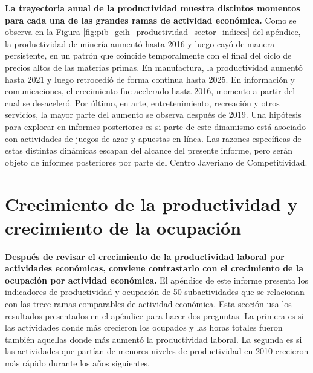 \textbf{La trayectoria anual de la productividad muestra distintos momentos para cada una de las grandes ramas de actividad económica.} Como se observa en la Figura \ref{fig:pib_geih_productividad_sector_indices} del apéndice, la productividad de minería aumentó hasta 2016 y luego cayó de manera persistente, en un patrón que coincide temporalmente con el final del ciclo de precios altos de las materias primas. En manufactura, la productividad aumentó hasta 2021 y luego retrocedió de forma continua hasta 2025. En información y comunicaciones, el crecimiento fue acelerado hasta 2016, momento a partir del cual se desaceleró. Por último, en arte, entretenimiento, recreación y otros servicios, la mayor parte del aumento se observa después de 2019. Una hipótesis para explorar en informes posteriores es si parte de este dinamismo está asociado con actividades de juegos de azar y apuestas en línea. Las razones específicas de estas distintas dinámicas escapan del alcance del presente informe, pero serán objeto de informes posteriores por parte del Centro Javeriano de Competitividad.




\section{Crecimiento de la productividad y crecimiento de la ocupación}

\textbf{Después de revisar el crecimiento de la productividad laboral por actividades económicas, conviene contrastarlo con el crecimiento de la ocupación por actividad económica.} El apéndice de este informe presenta los indicadores de productividad y ocupación de 50 subactividades que se relacionan con las trece ramas comparables de actividad económica. Esta sección usa los resultados presentados en el apéndice para hacer dos preguntas. La primera es si las actividades donde más crecieron los ocupados y las horas totales fueron también aquellas donde más aumentó la productividad laboral. La segunda es si las actividades que partían de menores niveles de productividad en 2010 crecieron más rápido durante los años siguientes.

